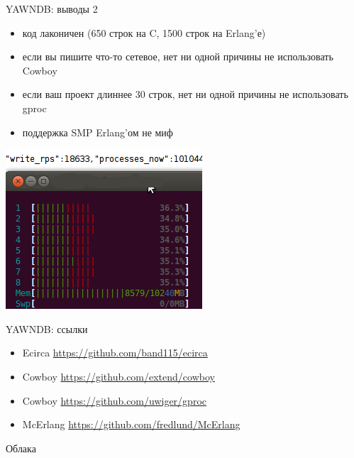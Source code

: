 \documentclass[10pt]{beamer}
\begin{document}
\begin{frame}{YAWNDB: выводы 2}
  \begin{itemize}
  \item код лаконичен (650 строк на C, 1500 строк на Erlang'е)
  \item если вы пишите что-то сетевое, нет ни одной причины не использовать Cowboy
  \item если ваш проект длиннее 30 строк, нет ни одной причины не использовать gproc
  \item поддержка SMP Erlang'ом не миф
  \end{itemize}
  \begin{center}
    \includegraphics[width=.5\textwidth]{top.png}
  \end{center}
\end{frame}

\begin{frame}{YAWNDB: ссылки}
  \begin{itemize}
  \item Ecirca \url{https://github.com/band115/ecirca}
  \item Cowboy \url{https://github.com/extend/cowboy}
  \item Cowboy \url{https://github.com/uwiger/gproc}
  \item McErlang \url{https://github.com/fredlund/McErlang}
  \end{itemize}
\end{frame}

\begin{frame}
  \begin{center}
    \Large
    Облака
  \end{center}
\end{frame}
\end{document}
